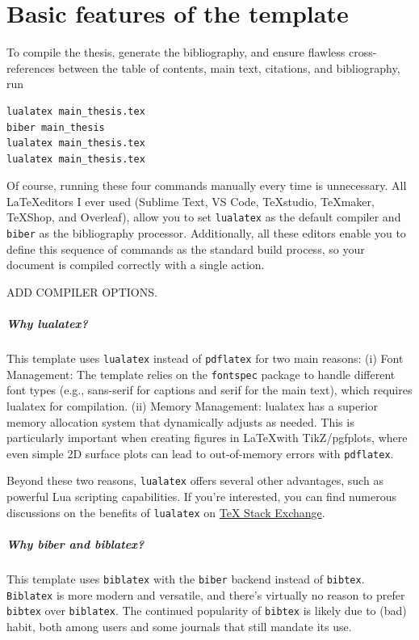 \graphicspath{{chapters/1_basicfeatures/figures/}}

\chapter{Basic features of the template}
To compile the thesis, generate the bibliography, and ensure flawless cross-references between the table of contents, main text, citations, and bibliography, run
\begin{lstlisting}
lualatex main_thesis.tex
biber main_thesis
lualatex main_thesis.tex
lualatex main_thesis.tex
\end{lstlisting}
Of course, running these four commands manually every time is unnecessary. All \LaTeX editors I ever used (Sublime Text, VS Code, TeXstudio, TeXmaker, TeXShop, and Overleaf), allow you to set \verb|lualatex| as the default compiler and \verb|biber| as the bibliography processor. Additionally, all these editors enable you to define this sequence of commands as the standard build process, so your document is compiled correctly with a single action.

ADD COMPILER OPTIONS.

\paragraph{Why lualatex?} 
This template uses \verb|lualatex| instead of \verb|pdflatex| for two main reasons:
(i) Font Management: The template relies on the \verb|fontspec| package to handle different font types (e.g., sans-serif for captions and serif for the main text), which requires lualatex for compilation.
(ii) Memory Management: lualatex has a superior memory allocation system that dynamically adjusts as needed. This is particularly important when creating figures in \LaTeX with TikZ/pgfplots, where even simple 2D surface plots can lead to out-of-memory errors with \verb|pdflatex|.

Beyond these two reasons, \verb|lualatex| offers several other advantages, such as powerful Lua scripting capabilities. If you're interested, you can find numerous discussions on the benefits of \verb|lualatex| on \href{tex.stackexchange.com}{TeX Stack Exchange}.

\paragraph{Why biber and biblatex?}

This template uses \verb|biblatex| with the \verb|biber| backend instead of \verb|bibtex|. \verb|Biblatex| is more modern and versatile, and there’s virtually no reason to prefer \verb|bibtex| over \verb|biblatex|. The continued popularity of \verb|bibtex| is likely due to (bad) habit, both among users and some journals that still mandate its use.

